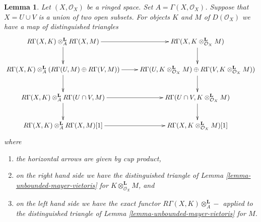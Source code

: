 \documentclass[10pt,a4paper]{amsart}
\theoremstyle{plain}
\newtheorem{lemma}[subsection]{Lemma}
\theoremstyle{definition}
\theoremstyle{remark}
\numberwithin{equation}{subsection}
\begin{document}
\begin{lemma}
\label{lemma-mayer-vietoris-cup}
Let $(X, \mathcal{O}_X)$ be a ringed space. Set $A = \Gamma(X, \mathcal{O}_X)$.
Suppose that $X = U \cup V$ is a union of two open subsets. For objects
$K$ and $M$ of $D(\mathcal{O}_X)$ we have a map of distinguished triangles
$$
\xymatrix{
R\Gamma(X, K) \otimes_A^\mathbf{L} R\Gamma(X, M) \ar[r] \ar[d] &
R\Gamma(X, K \otimes_{\mathcal{O}_X}^\mathbf{L} M) \ar[d] \\
R\Gamma(X, K) \otimes_A^\mathbf{L}
(R\Gamma(U, M) \oplus R\Gamma(V, M)) \ar[r] \ar[d] &
R\Gamma(U, K \otimes_{\mathcal{O}_X}^\mathbf{L} M)
\oplus R\Gamma(V, K \otimes_{\mathcal{O}_X}^\mathbf{L} M)) \ar[d] \\
R\Gamma(X, K) \otimes_A^\mathbf{L} R\Gamma(U \cap V, M) \ar[r] \ar[d] &
R\Gamma(U \cap V, K \otimes_{\mathcal{O}_X}^\mathbf{L} M) \ar[d] \\
R\Gamma(X, K) \otimes_A^\mathbf{L} R\Gamma(X, M)[1] \ar[r] &
R\Gamma(X, K \otimes_{\mathcal{O}_X}^\mathbf{L} M)[1]
}
$$
where
\begin{enumerate}
\item the horizontal arrows are given by cup product,
\item on the right hand side we have the distinguished triangle
of Lemma \ref{lemma-unbounded-mayer-vietoris} for
$K \otimes_{\mathcal{O}_X}^\mathbf{L} M$, and
\item on the left hand side we have the exact functor
$R\Gamma(X, K) \otimes_A^\mathbf{L} - $ applied to the
distinguished triangle of Lemma \ref{lemma-unbounded-mayer-vietoris} for $M$.
\end{enumerate}
\end{lemma}
\end{document}
